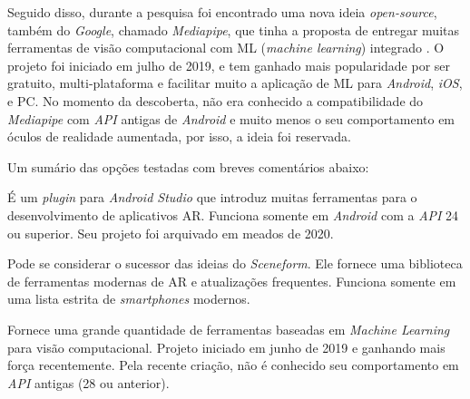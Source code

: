 Seguido disso, durante a pesquisa foi encontrado uma nova ideia \textit{open-source}, também do \textit{Google}, chamado \textit{Mediapipe}, que tinha a proposta de entregar muitas ferramentas de visão computacional com ML (\textit{machine learning}) integrado \cite{mediapipe-docs}. O projeto foi iniciado em julho de 2019, e tem ganhado mais popularidade por ser gratuito, multi-plataforma e facilitar muito a aplicação de ML para \textit{Android}, \textit{iOS}, e PC. No momento da descoberta, não era conhecido a compatibilidade do \textit{Mediapipe} com \textit{API} antigas de \textit{Android} e muito menos o seu comportamento em óculos de realidade aumentada, por isso, a ideia foi reservada.

\begin{description}
   \item Um sumário das opções testadas com breves comentários abaixo:
   \item[\textit{Google Sceneform}] É um \textit{plugin} para \textit{Android Studio} que introduz muitas ferramentas para o desenvolvimento de aplicativos AR. Funciona somente em \textit{Android} com a \textit{API} 24 ou superior. Seu projeto foi arquivado em meados de 2020. 
   \item[\textit{Google ARCore Services}] Pode se considerar o sucessor das ideias do \textit{Sceneform}. Ele fornece uma biblioteca de ferramentas modernas de AR e atualizações frequentes. Funciona somente em uma lista estrita de \textit{smartphones} modernos. 
   \item[\textit{Mediapipe}] Fornece uma grande quantidade de ferramentas baseadas em \textit{Machine Learning} para visão computacional. Projeto iniciado em junho de 2019 e ganhando mais força recentemente. Pela recente criação, não é conhecido seu comportamento em \textit{API} antigas (28 ou anterior).
\end{description}


